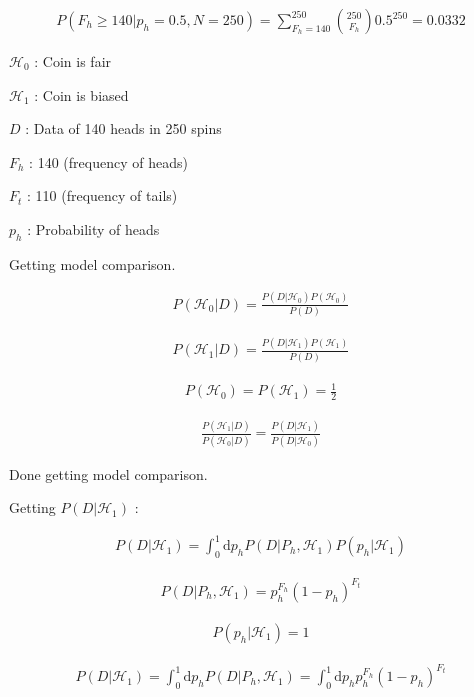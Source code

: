 \documentclass{article}
\begin{document}
\begin{gather}
P(F_h \geq 140 | p_h =0.5, N=250) = \sum_{F_h=140}^{250} \binom{250}{F_h}0.5^{250} = 0.0332
\end{gather}

$\mathcal{H}_0$ : Coin is fair

$\mathcal{H}_1$ : Coin is biased

$D$ : Data of 140 heads in 250 spins

$F_h$ : 140 (frequency of heads)

$F_t$ : 110 (frequency of tails)

$p_h$ : Probability of heads

Getting model comparison.

\begin{gather}
P(\mathcal{H}_0 | D) = \frac{P(D | \mathcal{H}_0)P(\mathcal{H}_0)}{P(D)}
\end{gather}

\begin{gather}
P(\mathcal{H}_1 | D) = \frac{P(D | \mathcal{H}_1)P(\mathcal{H}_1)}{P(D)}
\end{gather}

\begin{gather}
P(\mathcal{H}_0) = P(\mathcal{H}_1) = \frac{1}{2}
\end{gather}

\begin{gather}
\frac{P(\mathcal{H}_1 | D)}{P(\mathcal{H}_0 | D)} = \frac{P(D | \mathcal{H}_1)}{P(D | \mathcal{H}_0)}
\end{gather}

Done getting model comparison.

Getting $P(D|\mathcal{H}_1)$ :

\begin{gather}
P(D|\mathcal{H}_1) = \int_0^1 \! \mathrm{d}p_h P(D|P_h,\mathcal{H}_1)P(p_h|\mathcal{H}_1)
\end{gather}

\begin{gather}
P(D|P_h,\mathcal{H}_1) = p_h^{F_h}(1 - p_h)^{F_t}
\end{gather}

\begin{gather}
P(p_h|\mathcal{H}_1) = 1
\end{gather}

\begin{gather}
P(D|\mathcal{H}_1) = \int_0^1 \! \mathrm{d}p_h P(D|P_h,\mathcal{H}_1) =  \int_0^1 \! \mathrm{d}p_h p_h^{F_h}(1 - p_h)^{F_t}
\end{gather}
\end{document}
